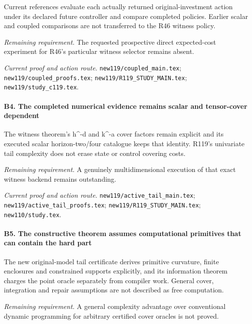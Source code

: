 Current references evaluate each actually returned original-investment action under its declared future controller and compare completed policies. Earlier scalar and coupled comparisons are not transferred to the R46 witness policy.

\par\emph{Remaining requirement.} The requested prospective direct expected-cost experiment for R46's particular witness selector remains absent.

\par\emph{Current proof and action route.} \nolinkurl{new119/coupled_main.tex}; \nolinkurl{new119/coupled_proofs.tex}; \nolinkurl{new119/R119_STUDY_MAIN.tex}; \nolinkurl{new119/study_c119.tex}.

\paragraph{B4. The completed numerical evidence remains scalar and tensor-cover dependent}

The witness theorem's h\textasciicircum{}-d and k\textasciicircum{}-a cover factors remain explicit and its executed scalar horizon-two/\allowbreak{}four catalogue keeps that identity. R119's univariate tail complexity does not erase state or control covering costs.

\par\emph{Remaining requirement.} A genuinely multidimensional execution of that exact witness backend remains outstanding.

\par\emph{Current proof and action route.} \nolinkurl{new119/active_tail_main.tex}; \nolinkurl{new119/active_tail_proofs.tex}; \nolinkurl{new119/R119_STUDY_MAIN.tex}; \nolinkurl{new110/study.tex}.

\paragraph{B5. The constructive theorem assumes computational primitives that can contain the hard part}

The new original-model tail certificate derives primitive curvature, finite enclosures and constrained supports explicitly, and its information theorem charges the point oracle separately from compiler work. General cover, integration and repair assumptions are not described as free computation.

\par\emph{Remaining requirement.} A general complexity advantage over conventional dynamic programming for arbitrary certified cover oracles is not proved.


